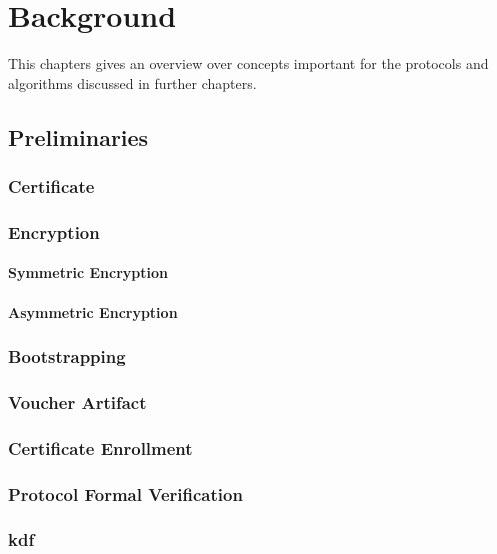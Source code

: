 \chapter{Background}
\label{ch:background}

This chapters gives an overview over concepts important for the protocols and algorithms discussed in further chapters.
\section{Preliminaries}

\subsection{Certificate}

\subsection{Encryption}
	\subsubsection{Symmetric Encryption}
	\subsubsection{Asymmetric Encryption}
	
\subsection{Bootstrapping}

\subsection{Voucher Artifact}

\subsection{Certificate Enrollment}

\subsection{Protocol Formal Verification}\label{bg:pfm}

\subsection{\acrfull*{kdf}} \label{backgroung:kdf}

